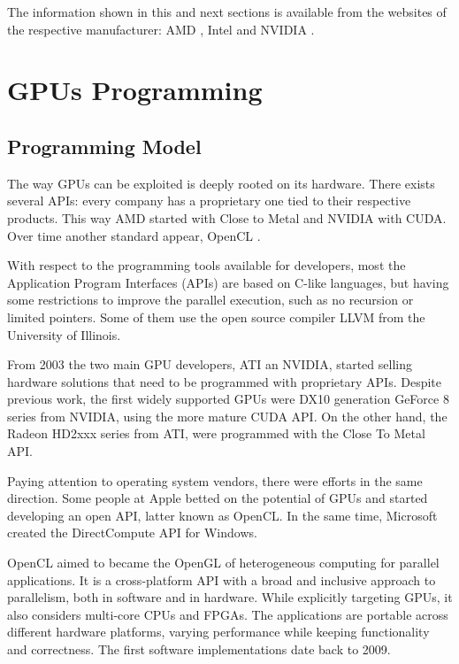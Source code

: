 \documentclass{comjnl}
\begin{document}
The information shown in this and next sections is available from the websites of the respective manufacturer: AMD \cite{amd}, Intel \cite{intel} and NVIDIA \cite{nvidia}.

\section{GPUs Programming}
\label{sec:programming}

\subsection{Programming Model}

The way GPUs can be exploited is deeply rooted on its hardware. There exists several APIs: every company has a proprietary one tied to their respective products. This way AMD started with Close to Metal and NVIDIA with CUDA. Over time another standard appear, OpenCL \cite{opencl}.

With respect to the programming tools available for developers, most the Application Program Interfaces (APIs) are based on C-like languages, but having some restrictions to improve the parallel execution, such as no recursion or limited pointers. Some of them use the open source compiler LLVM \cite{LLVM} from the University of Illinois.

From 2003 the two main GPU developers, ATI an NVIDIA, started selling hardware solutions that need to be programmed with proprietary APIs. Despite previous work, the first widely supported GPUs were DX10 generation GeForce 8 series from NVIDIA, using the more mature CUDA API. On the other hand, the Radeon HD2xxx series from ATI, were programmed with the Close To Metal API. 

Paying attention to operating system vendors, there were efforts in the same direction. Some people at Apple betted on the potential of GPUs and started developing an open API, latter known as OpenCL. In the same time, Microsoft created the DirectCompute API for Windows.

OpenCL aimed to became the OpenGL of heterogeneous computing for parallel applications. It is a cross-platform API with a broad and inclusive approach to parallelism, both in software and in hardware. While explicitly targeting GPUs, it also considers multi-core CPUs and FPGAs. The applications are portable across different hardware platforms, varying performance while keeping functionality and correctness. The first software implementations date back to 2009.
\end{document}

